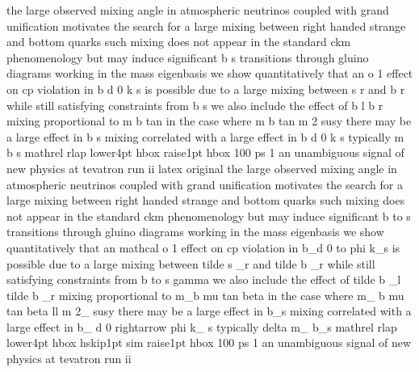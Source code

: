 the large observed mixing angle in atmospheric neutrinos coupled with grand unification motivates the search for a large mixing between right handed strange and bottom quarks such mixing does not appear in the standard ckm phenomenology but may induce significant b s transitions through gluino diagrams working in the mass eigenbasis we show quantitatively that an o 1 effect on cp violation in b d 0  k s is possible due to a large mixing between s r and b r while still satisfying constraints from b s  we also include the effect of b l b r mixing proportional to m b tan in the case where m b  tan  m 2 susy there may be a large effect in b s mixing correlated with a large effect in b d 0  k s typically  m b s mathrel rlap lower4pt hbox raise1pt hbox 100 ps 1 an unambiguous signal of new physics at tevatron run ii latex original the large observed mixing angle in atmospheric neutrinos coupled with grand unification motivates the search for a large mixing between right handed strange and bottom quarks such mixing does not appear in the standard ckm phenomenology but may induce significant b to s transitions through gluino diagrams working in the mass eigenbasis we show quantitatively that an mathcal o 1 effect on cp violation in b_d 0 to phi k_s is possible due to a large mixing between tilde s _r and tilde b _r while still satisfying constraints from b to s gamma we also include the effect of tilde b _l tilde b _r mixing proportional to m_b mu tan beta in the case where m_ b mu tan beta ll m 2_ susy there may be a large effect in b_s mixing correlated with a large effect in b_ d 0 rightarrow phi k_ s typically delta m_ b_s mathrel rlap lower4pt hbox hskip1pt sim raise1pt hbox 100 ps 1 an unambiguous signal of new physics at tevatron run ii
